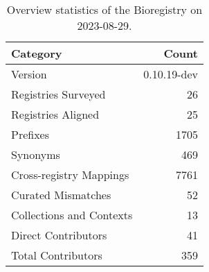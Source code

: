 \begin{table}
\caption{Overview statistics of the Bioregistry on 2023-08-29.}
\label{tab:bioregistry-summary}
\begin{tabular}{lr}
\toprule
Category & Count \\
\midrule
Version & 0.10.19-dev \\
Registries Surveyed & 26 \\
Registries Aligned & 25 \\
Prefixes & 1705 \\
Synonyms & 469 \\
Cross-registry Mappings & 7761 \\
Curated Mismatches & 52 \\
Collections and Contexts & 13 \\
Direct Contributors & 41 \\
Total Contributors & 359 \\
\bottomrule
\end{tabular}
\end{table}
